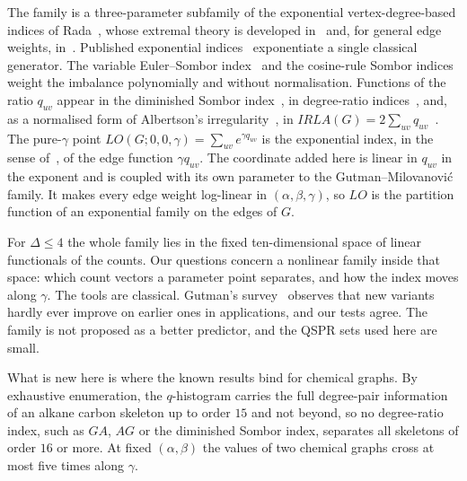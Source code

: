 \documentclass[a5paper, 10pt]{article}
\theoremstyle{plain}
\theoremstyle{remark}
\theoremstyle{definition}
\begin{document}
  The family is a three-parameter subfamily of the exponential
  vertex-degree-based indices of Rada~\cite{Rada2019ExpVDB}, whose
  extremal theory is developed
  in~\cite{CruzMonsalveRada2020, Sigarreta2022ExpVDB, GaoAMC2024} and, for general edge weights,
  in~\cite{HuMATCH2022}.
  Published exponential
  indices~\cite{DasMondal2024ExpGA, DasMondalRazaPal2025ExpISDD} exponentiate
  a single classical generator. The variable
  Euler--Sombor index~\cite{GutmanRedzepovicKizilirmakKulli2025EU} and
  the cosine-rule Sombor indices~\cite{NyauliBuragohain2026CoRSO} weight
  the imbalance polynomially and without normalisation. Functions of the ratio
  $q_{uv}$ appear in the diminished Sombor
  index~\cite{MovahediGutmanRedzepovicFurtula2026}, in degree-ratio
  indices~\cite{NyauliBuragohain2027DRSO, GutmanBuragohainNyauli2026},
  and, as a normalised form of Albertson's
  irregularity~\cite{Albertson1997, LinZhouWangMiao2022}, in
  $IRLA(G) = 2\sum_{uv} q_{uv}$~\cite{RetiSharafdini2018IRLA}. The
  pure-$\gamma$ point $LO(G;0,0,\gamma) = \sum_{uv} e^{\gamma q_{uv}}$
  is the exponential index, in the sense of~\cite{Rada2019ExpVDB}, of
  the edge function $\gamma q_{uv}$. The
  coordinate added here is linear in $q_{uv}$ in the exponent and is
  coupled with its own parameter to the Gutman--Milovanovi\'c family. It makes
  every edge weight log-linear in $(\alpha,\beta,\gamma)$, so $LO$ is
  the partition function of an exponential family on the edges of $G$.

  For $\Delta \le 4$ the whole family lies in the fixed
  ten-dimensional space of linear functionals of the counts. Our questions
  concern a nonlinear family inside that space: which count vectors a
  parameter point separates, and how the index moves along $\gamma$.
  The tools are classical. Gutman's survey~\cite{Gutman2026SomborSurvey}
  observes that new variants hardly ever improve on earlier ones in
  applications, and our tests agree. The family is not proposed as a
  better predictor, and the QSPR sets used here are small.

  What is new here is where the known results bind for chemical graphs. By
  exhaustive enumeration, the $q$-histogram carries the full
  degree-pair information of an alkane carbon skeleton up to order $15$
  and not beyond, so no degree-ratio index, such as $GA$, $AG$ or the
  diminished Sombor index, separates all skeletons of order $16$ or more.
  At fixed $(\alpha,\beta)$ the values of two chemical graphs cross at
  most five times along $\gamma$.
\end{document}
